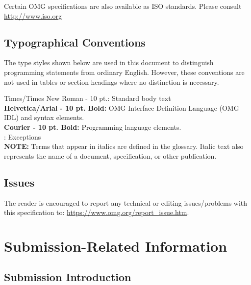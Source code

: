 Certain OMG specifications are also available as ISO standards. Please consult \url{http://www.iso.org} 

\section*{Typographical Conventions}
The type styles shown below are used in this document to distinguish programming statements from ordinary English. However, these conventions are not used in tables or section headings where no distinction is necessary.

Times/Times New Roman - 10 pt.:  Standard body text\\[\medskipamount]
{\small\sffamily\bfseries{Helvetica/Arial - 10 pt. Bold:}} OMG Interface Definition Language (OMG IDL) and syntax 
elements.\\[\medskipamount]
{\ttfamily\bfseries{Courier - 10 pt. Bold:}}  Programming language elements.\\[\medskipamount]
{\small{}}: Exceptions\\[\medskipamount]

{\bfseries{NOTE:}} Terms that appear in italics are defined in the glossary. Italic text also represents the name of a document, specification, or other publication.

\section*{Issues}

The reader is encouraged to report any technical or editing issues/problems with this specification to: {\url{https://www.omg.org/report\_issue.htm}}.
\vfill\eject


\setcounter{page}{1}



\chapter{Submission-Related Information}
\section{Submission Introduction}
{}

